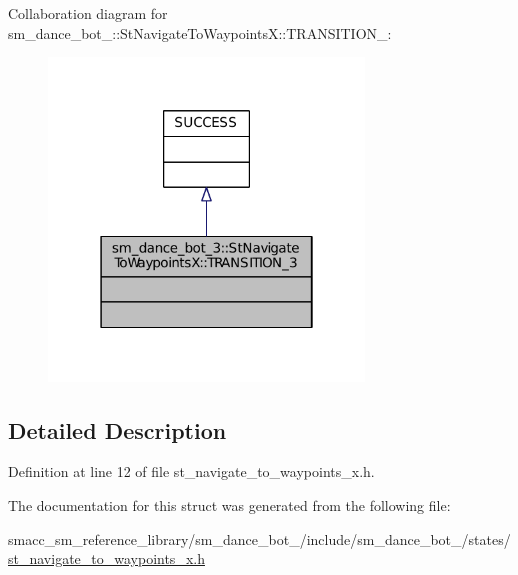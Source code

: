 Collaboration diagram for sm\+\_\+dance\+\_\+bot\+\_\+:\+:St\+Navigate\+To\+WaypointsX\+:\+:T\+R\+A\+N\+S\+I\+T\+I\+O\+N\+\_\+:
\nopagebreak
\begin{figure}[H]
\begin{center}
\leavevmode
\includegraphics[width=238pt]{structsm__dance__bot__3_1_1StNavigateToWaypointsX_1_1TRANSITION__3__coll__graph}
\end{center}
\end{figure}


\subsection{Detailed Description}


Definition at line 12 of file st\+\_\+navigate\+\_\+to\+\_\+waypoints\+\_\+x.\+h.



The documentation for this struct was generated from the following file\+:\begin{DoxyCompactItemize}
\item 
smacc\+\_\+sm\+\_\+reference\+\_\+library/sm\+\_\+dance\+\_\+bot\+\_/include/sm\+\_\+dance\+\_\+bot\+\_/states/\hyperlink{3_2include_2sm__dance__bot__3_2states_2st__navigate__to__waypoints__x_8h}{st\+\_\+navigate\+\_\+to\+\_\+waypoints\+\_\+x.\+h}\end{DoxyCompactItemize}
